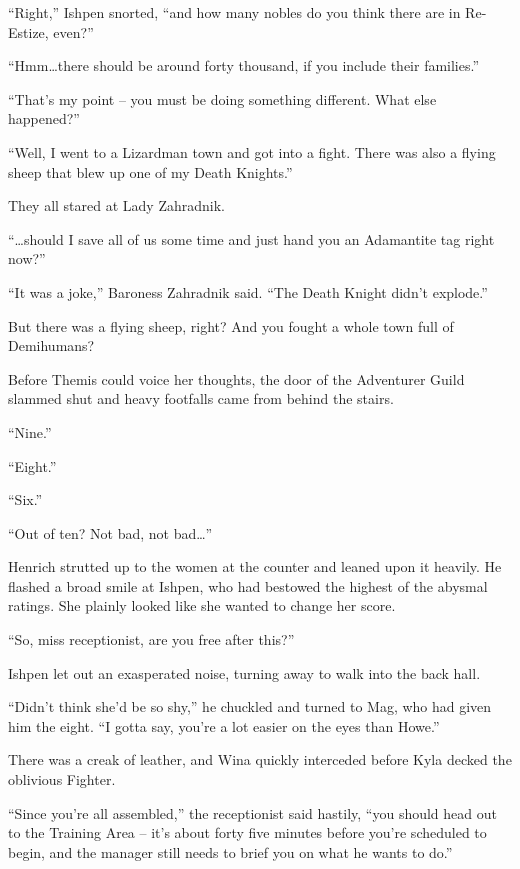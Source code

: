  

“Right,” Ishpen snorted, “and how many nobles do you think there are in Re-Estize, even?”

 

“Hmm…there should be around forty thousand, if you include their families.”

 

“That’s my point – you must be doing something different. What else happened?”

 

“Well, I went to a Lizardman town and got into a fight. There was also a flying sheep that blew up one of my Death Knights.”

 

They all stared at Lady Zahradnik.

 

“…should I save all of us some time and just hand you an Adamantite tag right now?”

 

“It was a joke,” Baroness Zahradnik said. “The Death Knight didn’t explode.”

 

But there was a flying sheep, right? And you fought a whole town full of Demihumans?

 

Before Themis could voice her thoughts, the door of the Adventurer Guild slammed shut and heavy footfalls came from behind the stairs.

 

“Nine.”

 

“Eight.”

 

“Six.”

 

“Out of ten? Not bad, not bad…”

 

Henrich strutted up to the women at the counter and leaned upon it heavily. He flashed a broad smile at Ishpen, who had bestowed the highest of the abysmal ratings. She plainly looked like she wanted to change her score.

 

“So, miss receptionist, are you free after this?”

 

Ishpen let out an exasperated noise, turning away to walk into the back hall.

 

“Didn’t think she’d be so shy,” he chuckled and turned to Mag, who had given him the eight. “I gotta say, you’re a lot easier on the eyes than Howe.”

 

There was a creak of leather, and Wina quickly interceded before Kyla decked the oblivious Fighter.

 

“Since you’re all assembled,” the receptionist said hastily, “you should head out to the Training Area – it’s about forty five minutes before you’re scheduled to begin, and the manager still needs to brief you on what he wants to do.”